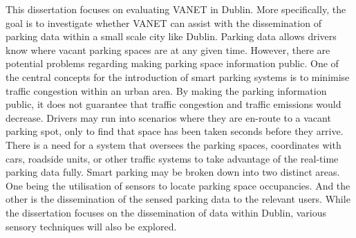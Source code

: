 This dissertation focuses on evaluating \ac{VANET} in Dublin. More specifically, the goal is to investigate whether \ac{VANET} can assist with the dissemination of parking data within a small scale city like Dublin. Parking data allows drivers know where vacant parking spaces are at any given time. However, there are potential problems regarding making parking space information public. One of the central concepts for the introduction of smart parking systems is to minimise traffic congestion within an urban area. By making the parking information public, it does not guarantee that traffic congestion and traffic emissions would decrease. Drivers may run into scenarios where they are en-route to a vacant parking spot, only to find that space has been taken seconds before they arrive. There is a need for a system that oversees the parking spaces, coordinates with cars, roadside units, or other traffic systems to take advantage of the real-time parking data fully. Smart parking may be broken down into two distinct areas. One being the utilisation of sensors to locate parking space occupancies. And the other is the dissemination of the sensed parking data to the relevant users. While the dissertation focuses on the dissemination of data within Dublin, various sensory techniques will also be explored.\\